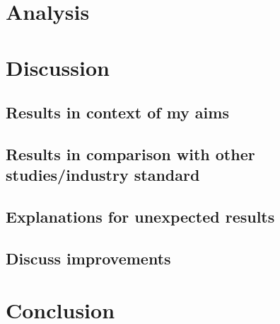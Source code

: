 \documentclass[aps,pra,a4paper,nofootinbib,onecolumn,tightenlines,longbibliography,12pt,amsfonts,amssymb,amsmath,floatfix]{revtex4-2} %
\begin{document}
      
\section{Analysis}
\label{sec:Analysis}


\section{Discussion} %
\label{sec:Discussion}


  \subsection{Results in context of my aims} %
  \label{sub:Results in context of my aims}

  \subsection{Results in comparison with other studies/industry standard} %
  \label{sub:Results in comparison with other studies/industry standard}
  
  \subsection{Explanations for unexpected results} %
  \label{sub:Explanations for unexpected results}
  
  \subsection{Discuss improvements} %
  \label{sub:Discuss improvement}



\section{Conclusion} %
\label{sec:Conclusion}

\end{document}
